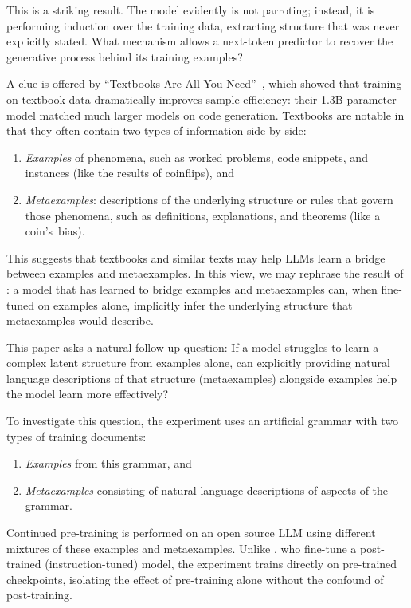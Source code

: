 \documentclass[11pt]{article}
\begin{document}
This is a striking result. The model evidently is not parroting; instead, it is performing induction over the training data, extracting structure that was never explicitly stated. What mechanism allows a next-token predictor to recover the generative process behind its training examples?

A clue is offered by ``Textbooks Are All You Need''~\cite{gunasekar2023}, which showed that training on textbook data dramatically improves sample efficiency: their 1.3B parameter model matched much larger models on code generation. Textbooks are notable in that they often contain two types of information side-by-side:

\begin{enumerate}
    \item \emph{Examples} of phenomena, such as worked problems, code snippets, and instances (like the results of coinflips), and
    \item \emph{Metaexamples}: descriptions of the underlying structure or rules that govern those phenomena, such as definitions, explanations, and theorems (like a coin's~bias).
\end{enumerate}

This suggests that textbooks and similar texts may help LLMs learn a bridge between examples and metaexamples. In this view, we may rephrase the result of \cite{treutlein2024}: a model that has learned to bridge examples and metaexamples can, when fine-tuned on examples alone, implicitly infer the underlying structure that metaexamples would describe.

This paper asks a natural follow-up question: If a model struggles to learn a complex latent structure from examples alone, can explicitly providing natural language descriptions of that structure (metaexamples) alongside examples help the model learn more effectively?

To investigate this question, the experiment uses an artificial grammar with two types of training documents:

\begin{enumerate}
    \item \emph{Examples} from this grammar, and
    \item \emph{Metaexamples} consisting of natural language descriptions of aspects of the grammar.
\end{enumerate}

Continued pre-training is performed on an open source LLM using different mixtures of these examples and metaexamples. Unlike \cite{treutlein2024}, who fine-tune a post-trained (instruction-tuned) model, the experiment trains directly on pre-trained checkpoints, isolating the effect of pre-training alone without the confound of post-training.
\end{document}
